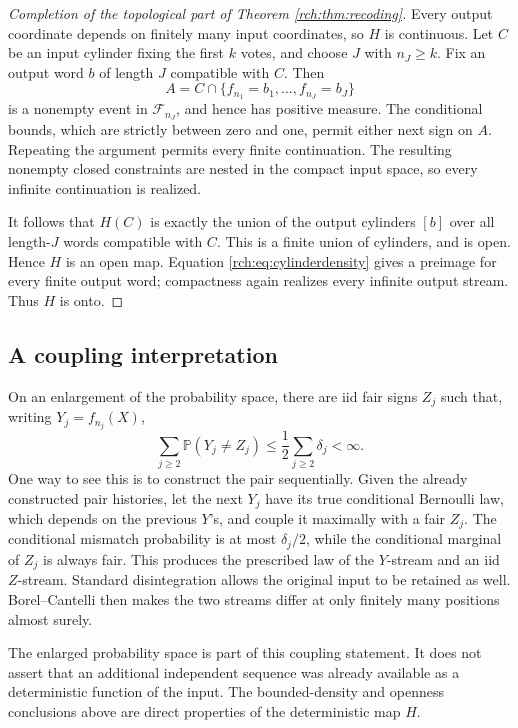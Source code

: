 \documentclass[11pt]{article}
\theoremstyle{definition}
\theoremstyle{remark}
\newcommand{\Prb}{\mathbb P}
\newcommand{\cF}{\mathcal F}
\begin{document}
\begin{proof}[Completion of the topological part of Theorem \ref{rch:thm:recoding}]
Every output coordinate depends on finitely many input coordinates, so \(H\)
is continuous. Let \(C\) be an input cylinder fixing the first \(k\) votes,
and choose \(J\) with \(n_J\ge k\). Fix an output word \(b\) of length
\(J\) compatible with \(C\). Then
\[
 A=C\cap\{f_{n_1}=b_1,\ldots,f_{n_J}=b_J\}
\]
is a nonempty event in \(\cF_{n_J}\), and hence has positive measure.
The conditional bounds, which are strictly between zero and one, permit either
next sign on \(A\). Repeating the argument permits every finite continuation.
The resulting nonempty closed constraints are nested in the compact input
space, so every infinite continuation is realized.

It follows that \(H(C)\) is exactly the union of the output cylinders
\([b]\) over all length-\(J\) words compatible with \(C\). This is a finite
union of cylinders, and is open. Hence \(H\) is an open map. Equation
\eqref{rch:eq:cylinderdensity} gives a preimage for every finite output word;
compactness again realizes every infinite output stream. Thus \(H\) is onto.
\end{proof}

\subsection{A coupling interpretation}

On an enlargement of the probability space, there are iid fair signs \(Z_j\)
such that, writing \(Y_j=f_{n_j}(X)\),
\begin{equation}
 \sum_{j\ge2}\Prb(Y_j\ne Z_j)
 \le\frac12\sum_{j\ge2}\delta_j<\infty.
 \label{rch:eq:coupling}
\end{equation}
One way to see this is to construct the pair sequentially. Given the already
constructed pair histories, let the next \(Y_j\) have its true conditional
Bernoulli law, which depends on the previous \(Y\)'s, and couple it maximally
with a fair \(Z_j\). The conditional mismatch probability is at most
\(\delta_j/2\), while the conditional marginal of \(Z_j\) is always fair.
This produces the prescribed law of the \(Y\)-stream and an iid \(Z\)-stream.
Standard disintegration allows the original input to be retained as well.
Borel--Cantelli then makes the two streams differ at only finitely many
positions almost surely.

The enlarged probability space is part of this coupling statement. It does not
assert that an additional independent sequence was already available as a
deterministic function of the input. The bounded-density and openness conclusions
above are direct properties of the deterministic map \(H\).
\end{document}
